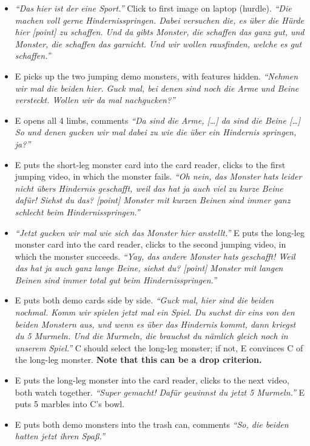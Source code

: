 \documentclass{article}
\begin{document}
\begin{itemize}
\item
  \emph{``Das hier ist der eine Sport.''} Click to first image on laptop (hurdle). \emph{``Die machen voll gerne Hindernisspringen. Dabei versuchen die, es über die Hürde hier {[}point{]} zu schaffen. Und da gibts Monster, die schaffen das ganz gut, und Monster, die schaffen das garnicht. Und wir wollen rausfinden, welche es gut schaffen.''}
\item
  E picks up the two jumping demo monsters, with features hidden. \emph{``Nehmen wir mal die beiden hier. Guck mal, bei denen sind noch die Arme und Beine versteckt. Wollen wir da mal nachgucken?''}
\item
  E opens all 4 limbs, comments \emph{``Da sind die Arme, {[}\ldots{}{]} da sind die Beine {[}\ldots{}{]} So und denen gucken wir mal dabei zu wie die über ein Hindernis springen, ja?''}
\item
  E puts the short-leg monster card into the card reader, clicks to the first jumping video, in which the monster fails. \emph{``Oh nein, das Monster hats leider nicht übers Hindernis geschafft, weil das hat ja auch viel zu kurze Beine dafür! Siehst du das? {[}point{]} Monster mit kurzen Beinen sind immer ganz schlecht beim Hindernisspringen.''}
\item
  \emph{``Jetzt gucken wir mal wie sich das Monster hier anstellt.''} E puts the long-leg monster card into the card reader, clicks to the second jumping video, in which the monster succeeds. \emph{``Yay, das andere Monster hats geschafft! Weil das hat ja auch ganz lange Beine, siehst du? {[}point{]} Monster mit langen Beinen sind immer total gut beim Hindernisspringen.''}
\item
  E puts both demo cards side by side. \emph{``Guck mal, hier sind die beiden nochmal. Komm wir spielen jetzt mal ein Spiel. Du suchst dir eins von den beiden Monstern aus, und wenn es über das Hindernis kommt, dann kriegst du 5 Murmeln. Und die Murmeln, die brauchst du nämlich gleich noch in unserem Spiel.''} C should select the long-leg monster; if not, E convinces C of the long-leg monster. \textbf{Note that this can be a drop criterion.}
\item
  E puts the long-leg monster into the card reader, clicks to the next video, both watch together. \emph{``Super gemacht! Dafür gewinnst du jetzt 5 Murmeln.''} E puts 5 marbles into C's bowl.
\item
  E puts both demo monsters into the trash can, comments \emph{``So, die beiden hatten jetzt ihren Spaß.''}
\end{itemize}
\end{document}
